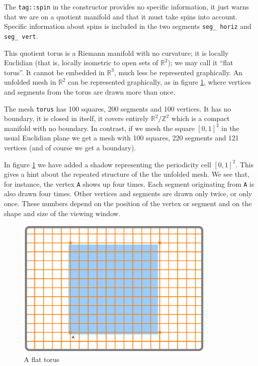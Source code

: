 The {\small\tt\textcolor{tag}{tag}::spin} in the constructor {\small{} }
provides no specific information, it just warns {\maniFEM} that we are on a quotient manifold
and that it must take spins into account.
Specific information about spins is included in the two segments {\small\tt seg\_\,horiz}
and {\small\tt seg\_\,vert}.

This quotient torus is a Riemann manifold with no curvature; it is locally Euclidian
(that is, locally isometric to open sets of $ \mathbb{R}^2 $); we may call it ``flat torus''.
It cannot be embedded in $ \mathbb{R}^3 $, much less be represented graphically.
An unfolded mesh in $ \mathbb{R}^2 $ can be represented graphically,
as in figure \ref{\numb section 7.\numb fig 1}, where vertices and segments from the torus
are drawn more than once.

The mesh {\small\tt torus} has 100 squares, 200 segments and 100 vertices.
It has no boundary, it is closed in itself, it covers entirely $ \mathbb{R}^2/{\mathbb Z}^2 $
which is a compact manifold with no boundary.
In contrast, if we mesh the square $ [0,1]^2 $ in the usual Euclidian plane
we get a mesh with 100 squares, 220 segments and 121 vertices (and of course we get a boundary).

In figure \ref{\numb section 7.\numb fig 1} we have added a shadow representing
the periodicity cell $ [0,1]^2 $.
This gives a hint about the repeated structure of the the unfolded mesh.
We see that, for instance, the vertex {\small\tt A} shows up four times.
Each segment originating from {\small\tt A} is also drawn four times.
Other vertices and segments are drawn only twice, or only once.
These numbers depend on the position of the vertex or segment and on the shape and size
of the viewing window.

\begin{figure}[ht] \centering
  \includegraphics[width=96mm]{flat-torus-1.eps}
  \caption{A flat torus}
  \label{\numb section 7.\numb fig 1}
\end{figure}

